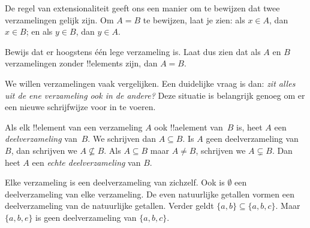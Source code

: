 \documentclass[openany]{memoir}
\begin{document}
De regel van extensionaliteit geeft ons een manier om te bewijzen dat
twee verzamelingen gelijk zijn. Om $A = B$ te bewijzen, laat je zien:
als $x \in A$, dan $x \in B$; en als $y \in B$, dan $y \in A$.

\begin{prob}
Bewijs dat er hoogstens één lege verzameling is. Laat dus zien dat als
$A$ en $B$ verzamelingen zonder !!{element}s zijn, dan $A = B$.
\end{prob}
\endgroup

\begingroup
\def\olfilename{OLP-0006}
\def\olfilepath{content/sets-functions-relations/sets/}
\hypertarget{unit-OLP-0006}{}




\begin{explain}
We willen verzamelingen vaak vergelijken. Een duidelijke vraag is dan:
\emph{zit alles uit de ene verzameling ook in de andere?} Deze situatie is
belangrijk genoeg om er een nieuwe schrijfwijze voor in te voeren.
\end{explain}

\begin{defn}[Deelverzameling]
Als elk !!{element} van een verzameling $A$ ook !!a{element} van~$B$
is, heet $A$ een \emph{deelverzameling} van~$B$. We schrijven dan
$A \subseteq B$. Is $A$ geen deelverzameling van~$B$, dan schrijven
we $A \not\subseteq B$. Als $A \subseteq B$ maar $A \neq B$, schrijven
we $A \subsetneq B$. Dan heet $A$ een \emph{echte deelverzameling}
van $B$.
\end{defn}

\begin{ex}
Elke verzameling is een deelverzameling van zichzelf. Ook is
$\emptyset$ een deelverzameling van elke verzameling. De even
natuurlijke getallen vormen een deelverzameling van de natuurlijke
getallen. Verder geldt $\{ a, b \} \subseteq \{ a, b, c \}$. Maar
$\{ a, b, e \}$ is geen deelverzameling van $\{ a, b, c \}$.
\end{ex}
\end{document}

